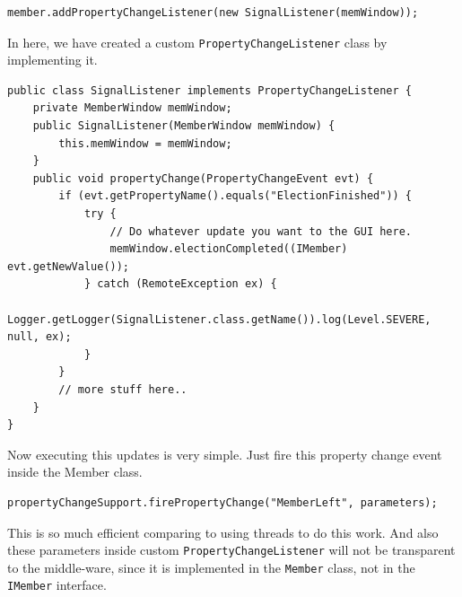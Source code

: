 \documentclass[a4paper,english,twoside]{article}
\begin{document}
{\small { \begin{lstlisting}
member.addPropertyChangeListener(new SignalListener(memWindow));
\end{lstlisting}}}

\noindent
In here, we have created a custom \texttt{PropertyChangeListener} class by implementing it.

{\small { \begin{lstlisting}
public class SignalListener implements PropertyChangeListener {
    private MemberWindow memWindow;
    public SignalListener(MemberWindow memWindow) {
        this.memWindow = memWindow;
    }
    public void propertyChange(PropertyChangeEvent evt) {
        if (evt.getPropertyName().equals("ElectionFinished")) {
            try {
                // Do whatever update you want to the GUI here.
                memWindow.electionCompleted((IMember) evt.getNewValue());
            } catch (RemoteException ex) {
                Logger.getLogger(SignalListener.class.getName()).log(Level.SEVERE, null, ex);
            }
        }
        // more stuff here..
    }
}
\end{lstlisting}}}

\noindent
Now executing this updates is very simple. Just fire this property change event inside the Member class.

{\small { \begin{lstlisting}
propertyChangeSupport.firePropertyChange("MemberLeft", parameters);
\end{lstlisting}}}

This is so much efficient comparing to using threads to do this work. And also these parameters inside custom \texttt{PropertyChangeListener} will not be transparent to the middle-ware, since it is implemented in the \texttt{Member} class, not in the \texttt{IMember} interface.
\end{document}

